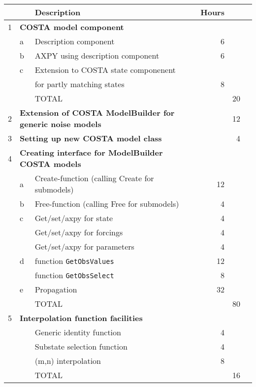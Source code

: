 \documentclass[a4paper,12pt]{article}
\begin{document}
\begin{tabular}{|lllrr|r}
\hline
  & & Description & Hours & \\
\hline\hline
1 & \multicolumn{2}{l}{\bf COSTA model component}  &      & \\
  & a & Description component                 &   6  & \\
  & b & AXPY using description component      &   6  & \\
  & c & Extension to COSTA state componenent  &      & \\
  &   &  for partly matching states           &   8  & \\
  &   & TOTAL                                 &      & 20 \\
\hline
\hline
2 & \multicolumn{2}{l}{\bf Extension of COSTA ModelBuilder for generic noise
                           models} && 12 \\
\hline
\hline
3 & \multicolumn{2}{l}{\bf Setting up new COSTA model class} && 4 \\
\hline
\hline
4 & \multicolumn{2}{l}{\bf Creating interface for ModelBuilder COSTA
models} && \\
  & a & Create-function (calling Create for submodels)   &12 & \\
  & b & Free-function (calling Free for submodels)       & 4 & \\
  & c & Get/set/axpy for state                           & 4 & \\
  &   & Get/set/axpy for forcings                        & 4 & \\
  &   & Get/set/axpy for parameters                      & 4 & \\
  & d & function {\tt GetObsValues}                      &12 & \\
  &   & function {\tt GetObsSelect}                      & 8 & \\
  & e & Propagation                                      &32 & \\
  &   & TOTAL                                            &   & 80\\
\hline\hline
5 & \multicolumn{2}{l}{\bf Interpolation function facilities}&   &   \\
  &   & Generic identity function              & 4 &   \\
  &   & Substate selection function            & 4 &   \\
  &   & (m,n) interpolation                    & 8 &   \\
  &   & TOTAL                                  &   & 16  \\

\end{tabular}
\end{document}
